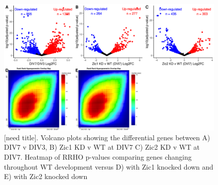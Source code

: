 \documentclass[fleqn,10pt]{wlscirep}
\begin{document}
\begin{figure}[!ht]
\centering
\includegraphics[width=.95\textwidth]{../figures/supp_figure_vitro.png}
\caption{ [need title]. Volcano plots showing the differential genes between A) DIV7 v DIV3, B) Zic1 KD v WT at DIV7 C) Zic2 KD v WT at DIV7. Heatmap of RRHO p-values comparing genes changing throughout WT  development versus D) with Zic1 knocked down and E) with Zic2 knocked down }
\label{fig:vitro}
\end{figure}
\end{document}
